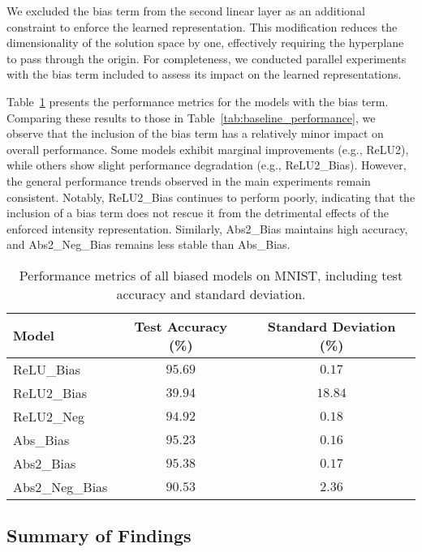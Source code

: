 We excluded the bias term from the second linear layer as an additional constraint to enforce the learned representation. This modification reduces the dimensionality of the solution space by one, effectively requiring the hyperplane to pass through the origin. For completeness, we conducted parallel experiments with the bias term included to assess its impact on the learned representations.

Table~\ref{tab:biased_performance} presents the performance metrics for the models with the bias term. Comparing these results to those in Table~\ref{tab:baseline_performance}, we observe that the inclusion of the bias term has a relatively minor impact on overall performance. Some models exhibit marginal improvements (e.g., ReLU2), while others show slight performance degradation (e.g., ReLU2\_Bias). However, the general performance trends observed in the main experiments remain consistent. Notably, ReLU2\_Bias continues to perform poorly, indicating that the inclusion of a bias term does not rescue it from the detrimental effects of the enforced intensity representation. Similarly, Abs2\_Bias maintains high accuracy, and Abs2\_Neg\_Bias remains less stable than Abs\_Bias.

\begin{table}[H]
    \centering
    \footnotesize
    \begin{tabular}{lcc}
    \toprule
    \textbf{Model} & \textbf{Test Accuracy (\%)} & \textbf{Standard Deviation (\%)} \\
    \midrule
    ReLU\_Bias & $95.69$ & $0.17$ \\
    ReLU2\_Bias & $39.94$ & $18.84$ \\
    ReLU2\_Neg & $94.92$ & $0.18$ \\
    Abs\_Bias & $95.23$ & $0.16$ \\
    Abs2\_Bias & $95.38$ & $0.17$ \\
    Abs2\_Neg\_Bias & $90.53$ & $2.36$ \\
    \bottomrule
    \end{tabular}
    \caption{Performance metrics of all biased models on MNIST, including test accuracy and standard deviation.}
    \label{tab:biased_performance}
\end{table}

\subsection{Summary of Findings}

